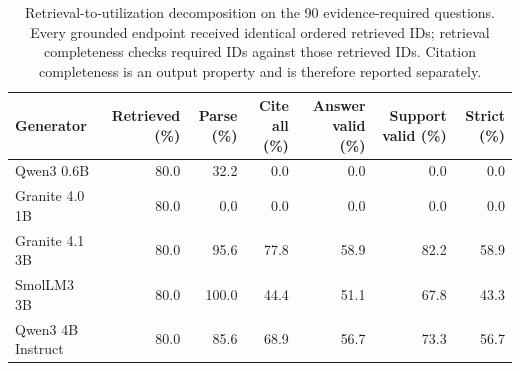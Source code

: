 \begin{table}[t]
\caption{Retrieval-to-utilization decomposition on the 90 evidence-required questions. Every grounded endpoint received identical ordered retrieved IDs; retrieval completeness checks required IDs against those retrieved IDs. Citation completeness is an output property and is therefore reported separately.}
\label{tab:retrieval-utilization}
\centering
\small
\begin{tabular}{@{}lrrrrrr@{}}
\toprule
Generator & Retrieved (\%) & Parse (\%) & Cite all (\%) & Answer valid (\%) & Support valid (\%) & Strict (\%) \\
\midrule
Qwen3 0.6B & 80.0 & 32.2 & 0.0 & 0.0 & 0.0 & 0.0 \\
Granite 4.0 1B & 80.0 & 0.0 & 0.0 & 0.0 & 0.0 & 0.0 \\
Granite 4.1 3B & 80.0 & 95.6 & 77.8 & 58.9 & 82.2 & 58.9 \\
SmolLM3 3B & 80.0 & 100.0 & 44.4 & 51.1 & 67.8 & 43.3 \\
Qwen3 4B Instruct & 80.0 & 85.6 & 68.9 & 56.7 & 73.3 & 56.7 \\
\bottomrule
\end{tabular}
\end{table}
